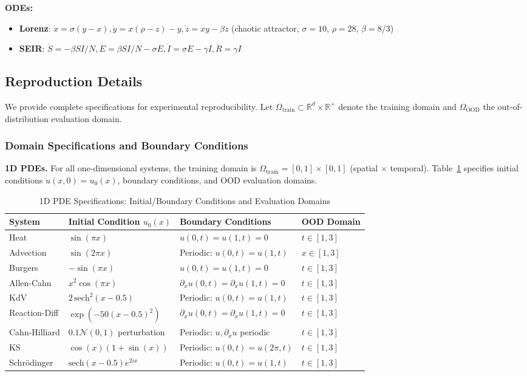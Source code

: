 \documentclass{article}
\theoremstyle{remark}
\begin{document}
\textbf{ODEs:}
\begin{itemize}
\item \textbf{Lorenz}: $\dot{x} = \sigma(y-x), \dot{y} = x(\rho-z)-y, \dot{z} = xy - \beta z$ (chaotic attractor, $\sigma=10$, $\rho=28$, $\beta=8/3$)
\item \textbf{SEIR}: $\dot{S} = -\beta SI/N, \dot{E} = \beta SI/N - \sigma E, \dot{I} = \sigma E - \gamma I, \dot{R} = \gamma I$
\end{itemize}

\subsection{Reproduction Details}
\label{app:reproduction}

We provide complete specifications for experimental reproducibility. Let $\Omega_{\text{train}} \subset \mathbb{R}^{d} \times \mathbb{R}^{+}$ denote the training domain and $\Omega_{\text{OOD}}$ the out-of-distribution evaluation domain.

\subsubsection{Domain Specifications and Boundary Conditions}

\textbf{1D PDEs.} For all one-dimensional systems, the training domain is $\Omega_{\text{train}} = [0,1] \times [0,1]$ (spatial $\times$ temporal). Table~\ref{tab:reproduction_1d} specifies initial conditions $u(x,0) = u_0(x)$, boundary conditions, and OOD evaluation domains.

\begin{table}[H]
\centering
\caption{1D PDE Specifications: Initial/Boundary Conditions and Evaluation Domains}
\label{tab:reproduction_1d}
\footnotesize
\begin{tabular}{llll}
\toprule
\textbf{System} & \textbf{Initial Condition} $u_0(x)$ & \textbf{Boundary Conditions} & \textbf{OOD Domain} \\
\midrule
Heat & $\sin(\pi x)$ & $u(0,t) = u(1,t) = 0$ & $t \in [1,3]$ \\
Advection & $\sin(2\pi x)$ & Periodic: $u(0,t) = u(1,t)$ & $x \in [1,3]$ \\
Burgers & $-\sin(\pi x)$ & $u(0,t) = u(1,t) = 0$ & $t \in [1,3]$ \\
Allen-Cahn & $x^2\cos(\pi x)$ & $\partial_x u(0,t) = \partial_x u(1,t) = 0$ & $t \in [1,3]$ \\
KdV & $2\,\text{sech}^2(x - 0.5)$ & Periodic: $u(0,t) = u(1,t)$ & $t \in [1,3]$ \\
Reaction-Diff & $\exp(-50(x-0.5)^2)$ & $\partial_x u(0,t) = \partial_x u(1,t) = 0$ & $t \in [1,3]$ \\
Cahn-Hilliard & $0.1\mathcal{N}(0,1)$ perturbation & Periodic: $u, \partial_x u$ periodic & $t \in [1,3]$ \\
KS & $\cos(x)(1+\sin(x))$ & Periodic: $u(0,t) = u(2\pi,t)$ & $t \in [1,3]$ \\
Schr\"odinger & $\text{sech}(x-0.5)e^{2ix}$ & Periodic: $u(0,t) = u(1,t)$ & $t \in [1,3]$ \\
\bottomrule
\end{tabular}
\end{table}
\end{document}
